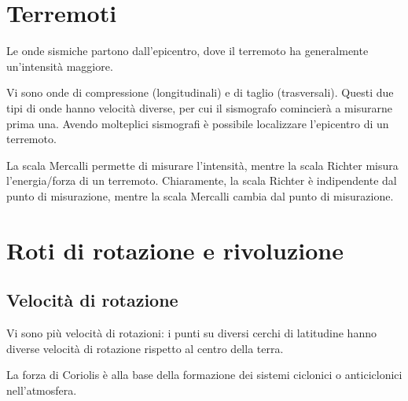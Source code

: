 \documentclass[a4paper]{article}
\begin{document}
\pagebreak

\section{Terremoti}



Le onde sismiche partono dall'epicentro, dove il terremoto ha generalmente un'intensità maggiore.

Vi sono onde di compressione (longitudinali) e di taglio (trasversali).
Questi due tipi di onde hanno velocità diverse, per cui il sismografo comincierà a misurarne
prima una.
Avendo molteplici sismografi è possibile localizzare l'epicentro di un terremoto.

La scala Mercalli permette di misurare l'intensità, mentre la scala Richter misura l'energia/forza di un terremoto.
Chiaramente, la scala Richter è indipendente dal punto di misurazione, mentre la scala Mercalli cambia dal punto di misurazione.


\pagebreak

\section{Roti di rotazione e rivoluzione}

\subsection{Velocità di rotazione}

Vi sono più velocità di rotazioni: i punti su diversi cerchi di latitudine hanno diverse velocità di rotazione rispetto al centro della terra.



La forza di Coriolis è alla base della formazione dei sistemi ciclonici o anticiclonici nell'atmosfera.
\end{document}
